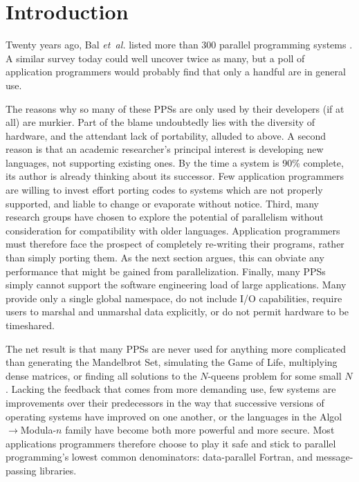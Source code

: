 \section{Introduction\label{s:intro}}

Twenty years ago,
Bal {\em{et~al.}\/} listed more than 300 parallel programming systems \cite{b:par-lang-survey}.
A similar survey today could well uncover twice as many,
but a poll of application programmers would probably find that
only a handful are in general use.

The reasons why so many of these PPSs are only used by their developers (if at all) are murkier.
Part of the blame undoubtedly lies with the diversity of hardware,
and the attendant lack of portability,
alluded to above.
A second reason is that an academic researcher's principal interest is developing new languages,
not supporting existing ones.
By the time a system is 90\% complete,
its author is already thinking about its successor.
Few application programmers are willing to invest effort porting codes
to systems which are not properly supported,
and liable to change or evaporate without notice.
Third,
many research groups have chosen to explore the potential of parallelism
without consideration for compatibility with older languages.
Application programmers must therefore face the prospect of completely re-writing their programs,
rather than simply porting them.
As the next section argues,
this can obviate any performance that might be gained from parallelization.
Finally,
many PPSs simply cannot support the software engineering load of large applications.
Many provide only a single global namespace,
do not include I/O capabilities,
require users to marshal and unmarshal data explicitly,
or do not permit hardware to be timeshared.

The net result is that many PPSs are never used for anything more complicated than
generating the Mandelbrot Set,
simulating the Game of Life,
multiplying dense matrices,
or finding all solutions to the $N$-queens problem for some small $N$.
Lacking the feedback that comes from more demanding use,
few systems are improvements over their predecessors
in the way that successive versions of operating systems have improved on one another,
or the languages in the Algol$\rightarrow$Modula-$n$ family
have become both more powerful and more secure.
Most applications programmers therefore choose to play it safe
and stick to parallel programming's lowest common denominators:
data-parallel Fortran,
and message-passing libraries.

